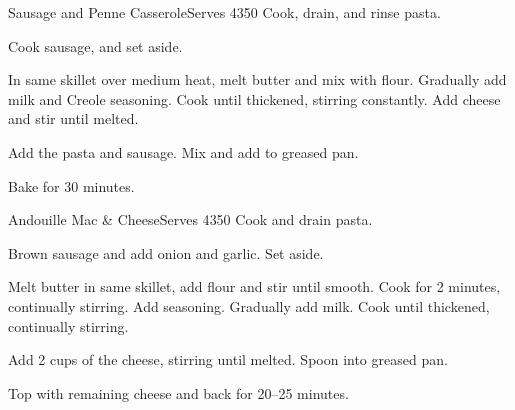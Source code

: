 \begin{recipe}{Sausage and Penne Casserole}{Serves 4}{350\0}
    Cook, drain, and rinse pasta.

    Cook sausage, and set aside.

    In same skillet over medium heat, melt butter and mix with flour. Gradually add milk and Creole seasoning. Cook until thickened, stirring constantly. Add cheese and stir until melted.

    Add the pasta and sausage. Mix and add to greased pan.

    \newstep
    Bake for 30 minutes.
\end{recipe}

\begin{recipe}{Andouille Mac \& Cheese}{Serves 4}{350\0}
    Cook and drain pasta.

    Brown sausage and add onion and garlic. Set aside.

    Melt butter in same skillet, add flour and stir until smooth. Cook for 2 minutes, continually stirring. Add seasoning. Gradually add milk. Cook until thickened, continually stirring.

    Add 2 cups of the cheese, stirring until melted. Spoon into greased pan.

    \newstep
    Top with remaining cheese and back for 20--25 minutes.
\end{recipe}
